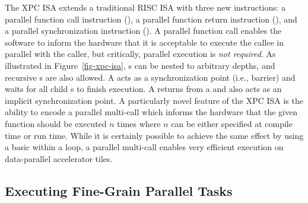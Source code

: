 

\begin{figure}
  \begin{minipage}[b]{0.44\tw}
    
  \end{minipage}%
  \hfill%
  \begin{minipage}[b]{0.54\tw}
    
  \end{minipage}
\end{figure}

The XPC ISA extends a traditional RISC ISA with three new instructions: a
parallel function call instruction (), a parallel function
return instruction (), and a parallel synchronization
instruction (). A parallel function call enables the software
to inform the hardware that it is acceptable to execute the callee in
parallel with the caller, but critically, parallel execution is \emph{not
  required}.
As illustrated in Figure~\ref{fig-xpc-isa}, s can be nested to
arbitrary depths, and recursive s are also allowed. A
 acts as a synchronization point (i.e., barrier) and waits for
all child s to finish execution.
A  returns from a  and also acts as an implicit
synchronization point. A particularly novel feature of the XPC ISA is the
ability to encode a parallel multi-call which informs the hardware that
the given function should be executed $n$ times where $n$ can be either
specified at compile time or run time. While it is certainly possible to
achieve the same effect by using a basic  within a loop, a
parallel multi-call enables very efficient execution on data-parallel
accelerator tiles.

\subsection{Executing Fine-Grain Parallel Tasks}


